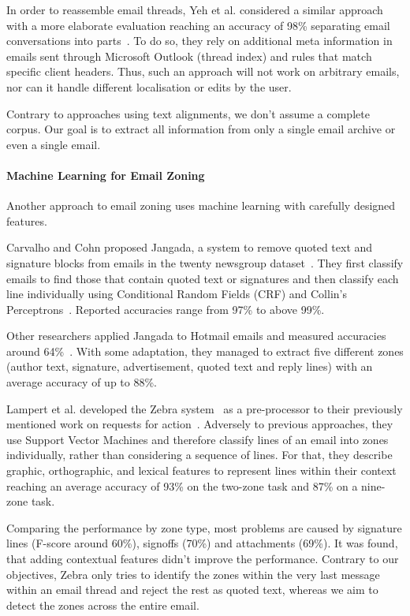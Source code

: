 \documentclass{llncs}
\begin{document}
In order to reassemble email threads, Yeh et al. considered a similar approach with a more elaborate evaluation reaching an accuracy of 98\% separating email conversations into parts~\cite{similarity}.
To do so, they rely on additional meta information in emails sent through Microsoft Outlook (thread index) and rules that match specific client headers.
Thus, such an approach will not work on arbitrary emails, nor can it handle different localisation or edits by the user.

Contrary to approaches using text alignments, we don't assume a complete corpus.
Our goal is to extract all information from only a single email archive or even a single email.

\paragraph{Machine Learning for Email Zoning}
Another approach to email zoning uses machine learning with carefully designed features.

Carvalho and Cohn proposed Jangada, a system to remove quoted text and signature blocks from emails in the twenty newsgroup dataset~\cite{signature,20news}.
They first classify emails to find those that contain quoted text or signatures and then classify each line individually using Conditional Random Fields (CRF) and Collin's Perceptrons~\cite{crf,cperceptron}.
Reported accuracies range from 97\% to above 99\%.

Other researchers applied Jangada to Hotmail emails and measured accuracies around 64\%~\cite{profiling}.
With some adaptation, they managed to extract five different zones (author text, signature, advertisement, quoted text and reply lines) with an average accuracy of up to 88\%.

Lampert et al. developed the Zebra system~\cite{zones} as a pre-processor to their previously mentioned work on requests for action~\cite{rfa}.
Adversely to previous approaches, they use Support Vector Machines and therefore classify lines of an email into zones individually, rather than considering a sequence of lines.
For that, they describe graphic, orthographic, and lexical features to represent lines within their context reaching an average accuracy of 93\% on the two-zone task and 87\% on a nine-zone task.

Comparing the performance by zone type, most problems are caused by signature lines (F-score around 60\%), signoffs (70\%) and attachments (69\%).
It was found, that adding contextual features didn't improve the performance.
Contrary to our objectives, Zebra only tries to identify the zones within the very last message within an email thread and reject the rest as quoted text, whereas we aim to detect the zones across the entire email.
\end{document}

